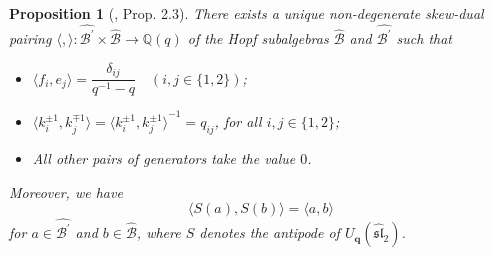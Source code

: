 \documentclass[12pt]{amsart}
\newtheorem{defi}[theorem]{Definition}
\newtheorem{proposition}[theorem]{Proposition}
\numberwithin{equation}{section}
\numberwithin{equation}{section}
\begin{document}
\begin{proposition}[\cite{HZhuang}, Prop. 2.3]
There exists a unique non-degenerate skew-dual pairing \(\langle , \rangle: \widehat{\mathcal{B}^{\prime}} \times \widehat{\mathcal{B}} \to \mathbb{Q}(q)\) of the Hopf subalgebras \(\widehat{\mathcal{B}}\) and \(\widehat{\mathcal{B}^{\prime}}\) such that
\begin{itemize}
\item 
\(\langle f_i, e_j \rangle = \dfrac{\delta_{ij}}{q^{-1} - q} \quad (i, j \in \{1, 2\})\);
\item \(\langle k^{\pm1}_i, k_j^{\mp 1} \rangle = {\langle k^{\pm1}_i, k_j^{\pm 1} \rangle}^{-1}=q_{ij}\), for all \(i, j \in \{1, 2\}\);
\item All other pairs of generators take the value \(0\).
\end{itemize}
Moreover, we have
\[
\langle S(a), S(b) \rangle = \langle a, b \rangle
\]
for \(a \in \widehat{\mathcal{B}^{\prime}}\) and \(b \in \widehat{\mathcal{B}}\), where \(S\) denotes the antipode of \(U_{\textbf{q}}(\widehat{\mathfrak{sl}}_2)\).
\end{proposition}
\end{document}
